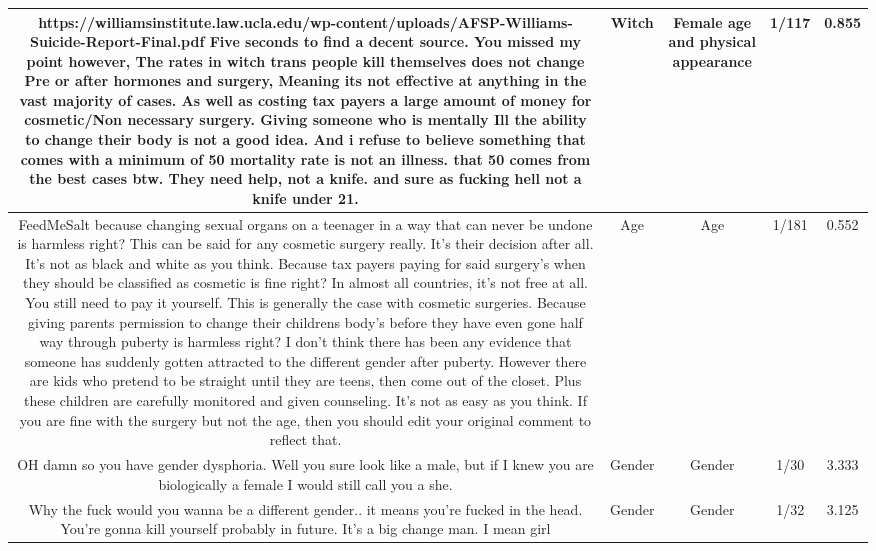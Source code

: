 \documentclass[11pt]{article}
\newlength\mylength
\begin{document}
\begin{center}
\begin{longtable}{|C{.40\mylength}|C{.30\mylength}|C{.15\mylength}|C{.15\mylength}|C{.15\mylength}|}
  https://williamsinstitute.law.ucla.edu/wp-content/uploads/AFSP-Williams-Suicide-Report-Final.pdf Five seconds to find a decent source. You missed my point however, The rates in witch trans people kill themselves does not change Pre or after hormones and surgery, Meaning its not effective at anything in the vast majority of cases. As well as costing tax payers a large amount of money for cosmetic/Non necessary surgery. Giving someone who is mentally Ill the ability to change their body is not a good idea. And i refuse to believe something that comes with a minimum of 50  mortality rate is not an illness. that 50  comes from the best cases btw. They need help, not a knife. and sure as fucking hell not a knife under 21.  & Witch & Female age and physical appearance & 1/117 & 0.855 \\  \hline
  FeedMeSalt  because changing sexual organs on a teenager in a way that can never be undone is harmless right?  This can be said for any cosmetic surgery really. It's their decision after all. It's not as black and white as you think.    Because tax payers paying for said surgery's when they should be classified as cosmetic is fine right?   In almost all countries, it's not free at all. You still need to pay it yourself. This is generally the case with cosmetic surgeries.    Because giving parents permission to change their childrens body's before they have even gone half way through puberty is harmless right?   I don't think there has been any evidence that someone has suddenly gotten attracted to the different gender after puberty. However there are kids who pretend to be straight until they are teens, then come out of the closet. Plus these children are carefully monitored and given counseling. It's not as easy as you think.  If you are fine with the surgery but not the age, then you should edit your original comment to reflect that.  & Age & Age & 1/181 & 0.552 \\  \hline
  OH damn so you have gender dysphoria. Well you sure look like a male, but if I knew you are biologically a female I would still call you a she.  & Gender & Gender & 1/30 & 3.333 \\  \hline
  Why the  fuck would you wanna be a different gender.. it means you're fucked in the head. You're gonna kill yourself probably in future. It's a big change man. I mean girl  & Gender & Gender & 1/32 & 3.125 \\  \hline

\end{longtable}
\end{center}
\end{document}

